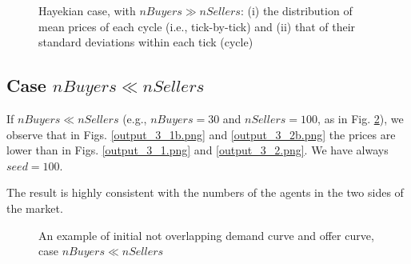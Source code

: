 \documentclass[12pt]{report}
\begin{document}
\begin{appendices}
\begin{figure}[htbp]
\begin{center}
\caption{Hayekian case, with $nBuyers \gg nSellers$: (i) the distribution of mean prices of each cycle (i.e., tick-by-tick) and (ii) that of their standard deviations within each tick (cycle)}
\label{output_3_2a.png}
\end{center}
\end{figure}

\subsection{Case $nBuyers \ll nSellers$}
If $nBuyers \ll nSellers$ (e.g., $nBuyers=30$ and $nSellers=100$, as in Fig. \ref{output_2_0b.png}), we observe that in Figs. \ref{output_3_1b.png} and \ref{output_3_2b.png} the prices are lower than in Figs. \ref{output_3_1.png} and \ref{output_3_2.png}. We have always $seed=100$.

The result is highly consistent with the numbers of the agents in the two sides of the market.


\begin{figure}[htbp]
\begin{center}
\caption{An example of initial not overlapping demand curve and offer curve, case $nBuyers \ll nSellers$}
\label{output_2_0b.png}
\end{center}
\end{figure}


\end{appendices}
\end{document}
